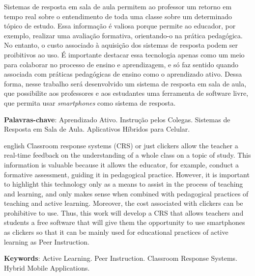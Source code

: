 \setlength{\absparsep}{18pt} %
\begin{resumo}
  Sistemas de resposta em sala de aula permitem ao professor um retorno
  em tempo real sobre o entendimento de toda uma classe sobre um determinado
  tópico de estudo. Essa informação é valiosa porque permite ao educador, por exemplo,
  realizar uma avaliação formativa, orientando-o na prática pedagógica.
  No entanto, o custo associado à aquisição dos sistemas de resposta podem ser proibitivos ao uso.
  É importante destacar essa tecnologia apenas como um meio para colaborar no processo
  de ensino e aprendizagem, e só faz sentido quando associada com práticas
  pedagógicas de ensino como o aprendizado ativo.
  Dessa forma, nesse trabalho será desenvolvido um sistema de resposta em sala de aula,
  que possibilite aos professores e aos estudantes uma ferramenta de software livre, que permita
  usar \textit{smartphones} como sistema de resposta.

 \textbf{Palavras-chave}:  Aprendizado Ativo. Instrução pelos Colegas. Sistemas de Resposta em Sala de Aula. Aplicativos Híbridos para Celular.
\end{resumo}

\begin{resumo}[Abstract]
 \begin{otherlanguage*}{english}
   Classroom response systems (CRS) or just clickers allow the teacher a real-time feedback on the understanding of a whole class on a topic of study. This information is valuable because it allows the educator, for example, conduct a formative assessment, guiding it in pedagogical practice.
   However, it is important to highlight this technology only as a means to assist in the process of teaching and learning, and only makes sense when combined with pedagogical practices of teaching and active learning. Moreover, the cost associated with clickers can be prohibitive to use. Thus, this work will develop a CRS that allows teachers and students a free software that will give them the opportunity to use smartphones as clickers so that it can be mainly used for educational practices of active learning as Peer Instruction.

   \noindent
   \textbf{Keywords}: Active Learning. Peer Instruction. Classroom Response Systems. Hybrid Mobile Applications.
 \end{otherlanguage*}
\end{resumo}
